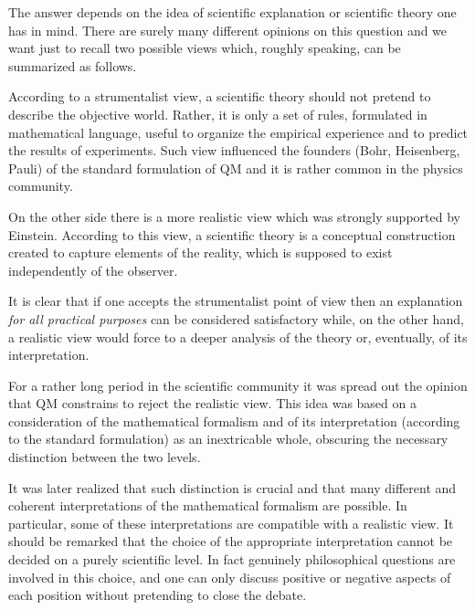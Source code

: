 \documentclass[12pt,reqno]{amsart}
\newcommand{\n}{\relax}
\numberwithin{equation}{section}
\begin{document}
\n
The answer  depends on the idea of scientific explanation or scientific theory one has in mind. There are surely many different opinions on this question and we want just to recall  two possible views 
which, roughly speaking, can be summarized  as follows.



\n
According to a strumentalist  view, a scientific theory should not pretend to describe the objective world. Rather, it is only a set of rules, formulated in mathematical language, useful to organize the empirical experience and to predict the results of experiments. 
Such view influenced the founders (Bohr, Heisenberg, Pauli) of the standard formulation of QM and it is rather common in the physics community.

\n
On the other side there is a more realistic view which was strongly supported by Einstein. According to this view, a scientific theory is a conceptual construction created to capture elements of the reality, which is supposed to exist independently of the observer.  

\n
It is clear that if one accepts the strumentalist point of view then an  explanation {\em for all practical purposes } can be considered  satisfactory  while, on the other hand, a realistic view would force to a deeper analysis of the theory or, eventually, of its interpretation.

\n
For a rather long  period in the scientific community it was spread out the opinion that QM  constrains to reject  the realistic view.  This idea  was based on a consideration of the mathematical formalism and of its interpretation (according to the standard formulation) as an inextricable whole, obscuring the necessary distinction between the two levels.

\n
It was later realized that such  distinction is crucial and that  many different and coherent  interpretations of the mathematical formalism are possible. In particular,  some of these interpretations are compatible with a realistic view.   It should be remarked that the choice of the appropriate interpretation cannot be decided on  a purely scientific level. 
In fact  genuinely philosophical questions are involved in this choice,  and one can only discuss positive or negative aspects of each position without pretending to close the debate.

\n
\end{document}
